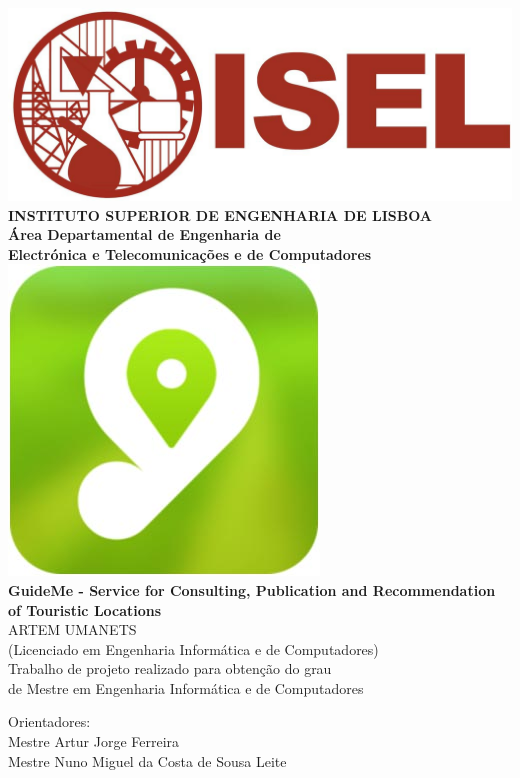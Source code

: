 \begin{titlepage}
	\thispagestyle{empty}
	\begin{center}
		\includegraphics[width=5 cm]{./images/isel_logo.jpg} \\[0.5cm]
		{\Large \textbf{INSTITUTO SUPERIOR DE ENGENHARIA DE LISBOA}} \\[0.5cm]
		{\Large \textbf{Área Departamental de Engenharia de \\Electrónica e Telecomunica\c cões e de Computadores}} \\[0.8cm]		
		\includegraphics[height=3.5 cm]{./images/guide_me_logo.jpg} \\[0.8cm]
		\fontsize{18pt}{10pt}\selectfont
		{\textbf{GuideMe - Service for Consulting, Publication and Recommendation of Touristic Locations}} \\[0.8cm]
		\fontsize{16pt}{10pt}\selectfont
		ARTEM UMANETS\\[0.2cm]
		\fontsize{14pt}{10pt}\selectfont
		(Licenciado em Engenharia Informática e de Computadores)\\[0.8cm]
		\fontsize{12pt}{10pt}\selectfont
		{Trabalho de projeto realizado para obten\c cão do grau\\de Mestre em Engenharia Informática e de Computadores} \\[0.8cm]
		\vfill
		\begin{tabbing}
		   \fontsize{12pt}{10pt}\selectfont
		   Orientadores: \\
		   \fontsize{11pt}{10pt}\selectfont
		   \hspace{1.1cm}Mestre Artur Jorge Ferreira \\
		   \fontsize{11pt}{10pt}\selectfont
		   \hspace{1.1cm}Mestre Nuno Miguel da Costa de Sousa Leite \\
		\end{tabbing}
		\begin{tabbing}

\end{tabbing}
\end{center}
\end{titlepage}

